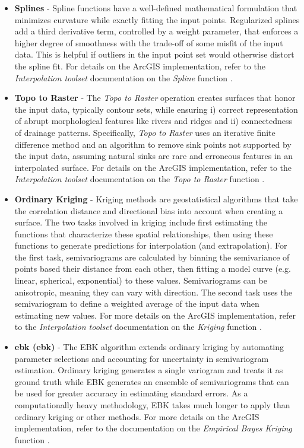 \begin{itemize}
\item{\textbf{Splines}}\label{ch3:splines} - Spline functions have a well-defined mathematical formulation that minimizes curvature while exactly fitting the input points. Regularized splines add a third derivative term, controlled by a weight parameter, that enforces a higher degree of smoothness with the trade-off of some misfit of the input data. This is helpful if outliers in the input point set would otherwise distort the spline fit. For details on the ArcGIS implementation, refer to the \textit{Interpolation toolset} documentation on the \textit{Spline} function \citep{esri_how_2021-2}.
\item{\textbf{Topo to Raster}}\label{ch3:topo2r} - The \textit{Topo to Raster} operation creates surfaces that honor the input data, typically contour sets, while ensuring i) correct representation of abrupt morphological features like rivers and ridges and ii) connectedness of drainage patterns. Specifically, \textit{Topo to Raster} uses an iterative finite difference method and an algorithm to remove sink points not supported by the input data, assuming natural sinks are rare and erroneous features in an interpolated surface. For details on the ArcGIS implementation, refer to the \textit{Interpolation toolset} documentation on the \textit{Topo to Raster} function \citep{esri_how_2021-1}.
\item{\textbf{Ordinary Kriging}}\label{ch3:kriging} - Kriging methods are geostatistical algorithms that take the correlation distance and directional bias into account when creating a surface. The two tasks involved in kriging include first estimating the functions that characterize these spatial relationships, then using these functions to generate predictions for interpolation (and extrapolation). For the first task, semivariograms are calculated by binning the semivariance of points based their distance from each other, then fitting a model curve (e.g. linear, spherical, exponential) to these values. Semivariograms can be anisotropic, meaning they can vary with direction. The second task uses the semivariogram to define a weighted average of the input data when estimating new values. For more details on the ArcGIS implementation, refer to the \textit{Interpolation toolset} documentation on the \textit{Kriging} function \citep{esri_how_2021}.
\item{\textbf{\acrlong{ebk} (\acrshort{ebk})}}\label{ch3:ebk} - The EBK algorithm extends ordinary kriging by automating parameter selections and accounting for uncertainty in semivariogram estimation. Ordinary kriging generates a single variogram and treats it as ground truth while EBK generates an ensemble of semivariograms that can be used for greater accuracy in estimating standard errors. As a computationally heavy methodology, EBK takes much longer to apply than ordinary kriging or other methods. For more details on the ArcGIS implementation, refer to the documentation on the \textit{Empirical Bayes Kriging} function \citep{esri_what_2021}.

\end{itemize}

